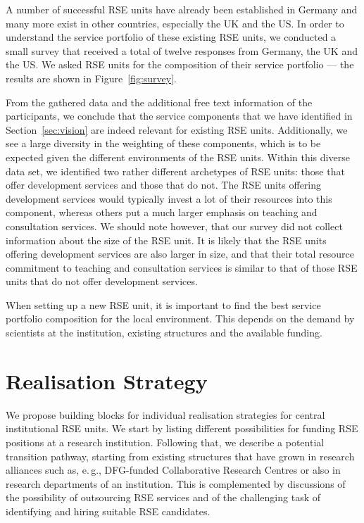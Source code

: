 \documentclass[a4paper]{article}
\newcommand*{\eg}{e.\,g.,\xspace}
\begin{document}
A number of successful RSE units have already been established in Germany and many more exist in other countries, especially the UK and the US\@.
In order to understand the service portfolio of these existing RSE units, we conducted a small survey that received a total of twelve responses from Germany, the UK and the US\@.
We asked RSE units for the composition of their service portfolio --- the results are shown in Figure~\ref{fig:survey}.

From the gathered data and the additional free text information of the participants, we conclude that the service components that we have identified in Section~\ref{sec:vision} are indeed relevant for existing RSE units.
Additionally, we see a large diversity in the weighting of these components, which is to be expected given the different environments of the RSE units.
Within this diverse data set, we identified two rather different archetypes of RSE units: those that offer development services and those that do not.
The RSE units offering development services would typically invest a lot of their resources into this component, whereas others put a much larger emphasis on teaching and consultation services.
We should note however, that our survey did not collect information about the size of the RSE unit.
It is likely that the RSE units offering development services are also larger in size,
  and that their total resource commitment to teaching and consultation services is similar to that of those RSE units that do not offer development services.

When setting up a new RSE unit, it is important to find the best service portfolio composition for the local environment.
This depends on the demand by scientists at the institution, existing structures and the available funding.

\section{Realisation Strategy}%
\label{sec:realisation}

We propose building blocks for individual realisation strategies for central institutional RSE units.
We start by listing different possibilities for funding RSE positions at a research institution.
Following that, we describe a potential transition pathway, starting from existing structures that have grown in research alliances such as, \eg{} DFG-funded Collaborative Research Centres or also in research departments of an institution.
This is complemented by discussions of the possibility of outsourcing RSE services and of the challenging task of identifying and hiring suitable RSE candidates.
\end{document}
